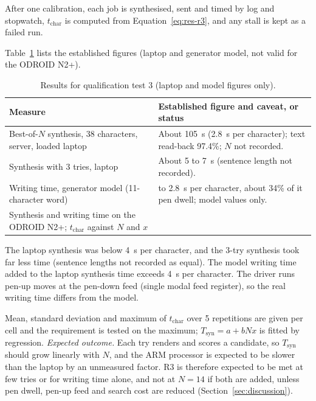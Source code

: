 
            After one calibration, each job is synthesised, sent and timed by log and stopwatch, $t_{\mathrm{char}}$ is computed from Equation~\ref{eq:res-r3}, and any stall is kept as a failed run.


            Table~\ref{tab:res-r3} lists the established figures (laptop and generator model, not valid for the ODROID N2+).

\begin{table}[h]
\centering
\fontsize{10}{12}\selectfont
\begin{tabularx}{\linewidth}{|>{\raggedright\arraybackslash}p{4.5cm}|>{\raggedright\arraybackslash}X|}
\hline
\textbf{Measure} & \textbf{Established figure and caveat, or status} \\
\hline
Best-of-$N$ synthesis, 38 characters, server, loaded laptop & About 105~s (2.8~s per character); text read-back 97.4\%; $N$ not recorded. \\
\hline
Synthesis with 3 tries, laptop & About 5 to 7~s (sentence length not recorded). \\
\hline
Writing time, generator model (11-character word) & 2.4 to 2.8~s per character, about 34\% of it pen dwell; model values only. \\
\hline
Synthesis and writing time on the ODROID N2+; $t_{\mathrm{char}}$ against $N$ and $x$ & \nym{} \\
\hline
\end{tabularx}
\caption{Results for qualification test 3 (laptop and model figures only).}
\label{tab:res-r3}
\end{table}


            The laptop synthesis was below 4~s per character, and the 3-try synthesis took far less time (sentence lengths not recorded as equal).
            The model writing time added to the laptop synthesis time exceeds 4~s per character.
            The driver runs pen-up moves at the pen-down feed (single modal feed register), so the real writing time differs from the model.


            Mean, standard deviation and maximum of $t_{\mathrm{char}}$ over 5 repetitions are given per cell and the requirement is tested on the maximum; $T_{\mathrm{syn}}=a+bNx$ is fitted by regression.
            \emph{Expected outcome.}
            Each try renders and scores a candidate, so $T_{\mathrm{syn}}$ should grow linearly with $N$, and the ARM processor is expected to be slower than the laptop by an unmeasured factor.
            R3 is therefore expected to be met at few tries or for writing time alone, and not at $N=14$ if both are added, unless pen dwell, pen-up feed and search cost are reduced (Section~\ref{sec:discussion}).

